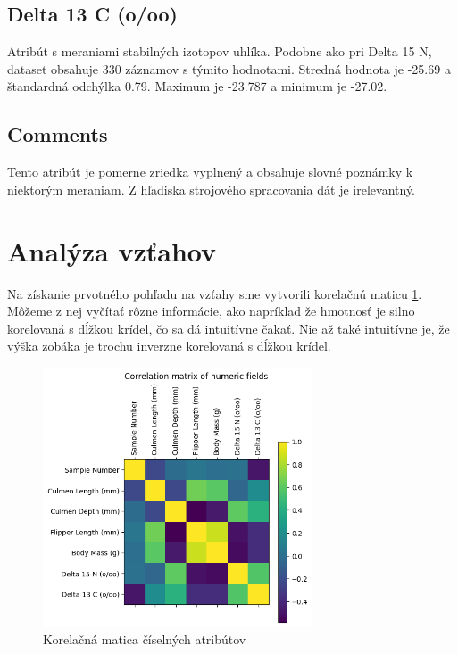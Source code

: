 \documentclass[10pt,xcolor=pdflatex,dvipsnames,table,oneside]{book}
\begin{document}
\subsection*{Delta 13 C (o/oo)}
Atribút s meraniami stabilných izotopov uhlíka. Podobne ako pri Delta 15 N, dataset obsahuje 330 záznamov s týmito hodnotami. Stredná hodnota je -25.69 a štandardná odchýlka 0.79. Maximum je -23.787 a minimum je -27.02.


\subsection*{Comments}
Tento atribút je pomerne zriedka vyplnený a obsahuje slovné poznámky k niektorým meraniam. Z hľadiska strojového spracovania dát je irelevantný.

\newpage
\section{Analýza vzťahov}
Na získanie prvotného pohľadu na vzťahy sme vytvorili korelačnú maticu \ref{fig:corr}. Môžeme z nej vyčítať rôzne informácie, ako napríklad že hmotnosť je silno korelovaná s dĺžkou krídel, čo sa dá intuitívne čakať. Nie až také intuitívne je, že výška zobáka je trochu inverzne korelovaná s dĺžkou krídel.

\begin{figure}[h]
  \centering
  \includegraphics[width=8cm]{img/corr.png}
  \caption{Korelačná matica číselných atribútov}
  \label{fig:corr}
\end{figure}
\FloatBarrier
\end{document}

